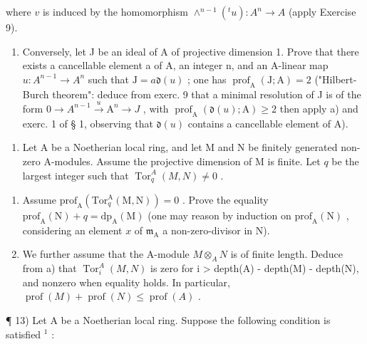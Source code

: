 where \(v\) is induced by the homomorphism \(\wedge^{n-1}(^t u): A^n \to A\) (apply Exercise 9).

\begin{enumerate}
\def\labelenumi{\alph{enumi})}
\setcounter{enumi}{1}
\tightlist
\item
  Conversely, let J be an ideal of A of projective dimension 1. Prove that there exists a cancellable element a of A, an integer n, and an A-linear map \(u: A^{n-1} \to A^n\) such that \(\mathrm{J} = a\mathfrak{d}(u)\) ; one has \(\operatorname{prof}_{\mathrm{A}}(\mathrm{J}; \mathrm{A}) = 2\) ("Hilbert-Burch theorem": deduce from exerc. 9 that a minimal resolution of J is of the form \(0 \to A^{n-1} \xrightarrow{u} \mathrm{A}^n \to J\) , with \(\operatorname{prof}_{\mathrm{A}}(\mathfrak{d}(u); \mathrm{A}) \geqslant 2\) then apply a) and exerc. 1 of § 1, observing that \(\mathfrak{d}(u)\) contains a cancellable element of A).
\end{enumerate}

\begin{enumerate}
\def\labelenumi{\arabic{enumi})}
\setcounter{enumi}{11}
\tightlist
\item
  Let A be a Noetherian local ring, and let M and N be finitely generated non-zero \(\mathrm{A}\)-modules. Assume the projective dimension of M is finite. Let \(q\) be the largest integer such that \(\operatorname{Tor}_q^A(M, N) \neq 0\) .
\end{enumerate}

\begin{enumerate}
\def\labelenumi{\alph{enumi})}
\item
  Assume \(\mathrm{prof}_{\mathrm{A}}(\mathrm{Tor}_{q}^{\mathrm{A}}(\mathrm{M},\mathrm{N})) = 0\) . Prove the equality \(\mathrm{prof}_{\mathrm{A}}(\mathrm{N}) + q = \mathrm{dp}_{\mathrm{A}}(\mathrm{M})\) (one may reason by induction on \(\mathrm{prof}_{\mathrm{A}}(\mathrm{N})\) , considering an element \(x\) of \(\mathfrak{m}_{\mathrm{A}}\) a non-zero-divisor in N).
\item
  We further assume that the A-module \(M \otimes_{A} N\) is of finite length. Deduce from a) that \(\operatorname{Tor}_{i}^{A}(M, N)\) is zero for i \textgreater{} depth(A) - depth(M) - depth(N), and nonzero when equality holds. In particular, \(\operatorname{prof}(M) + \operatorname{prof}(N) \leqslant \operatorname{prof}(A)\) .
\end{enumerate}

¶ 13) Let A be a Noetherian local ring. Suppose the following condition is satisfied \(^{1}\) :

